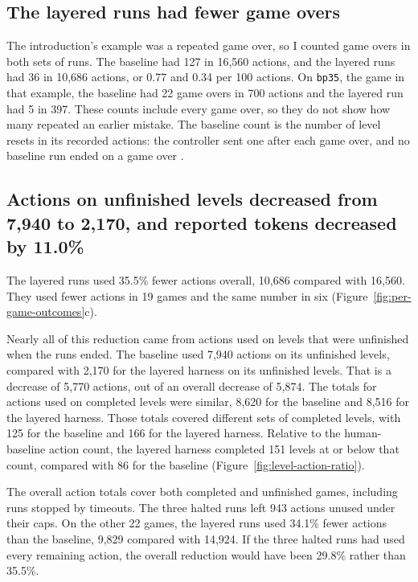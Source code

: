 \subsection{The layered runs had fewer game overs}\label{sec:result-game-overs}
The introduction's example was a repeated game over, so I counted game overs in both sets of runs. The baseline had 127 in 16,560 actions, and the layered runs had 36 in 10,686 actions, or 0.77 and 0.34 per 100 actions. On \texttt{bp35}, the game in that example, the baseline had 22 game overs in 700 actions and the layered run had 5 in 397. These counts include every game over, so they do not show how many repeated an earlier mistake. The baseline count is the number of level resets in its recorded actions: the controller sent one after each game over, and no baseline run ended on a game over \citep{dai2026baselineactions,dai2026layered}.

\subsection{Actions on unfinished levels decreased from 7,940 to 2,170, and reported tokens decreased by 11.0\%}\label{sec:result-resources}
The layered runs used 35.5\% fewer actions overall, 10,686 compared with 16,560. They used fewer actions in 19 games and the same number in six (Figure~\ref{fig:per-game-outcomes}c).

Nearly all of this reduction came from actions used on levels that were unfinished when the runs ended. The baseline used 7,940 actions on its unfinished levels, compared with 2,170 for the layered harness on its unfinished levels. That is a decrease of 5,770 actions, out of an overall decrease of 5,874. The totals for actions used on completed levels were similar, 8,620 for the baseline and 8,516 for the layered harness. Those totals covered different sets of completed levels, with 125 for the baseline and 166 for the layered harness. Relative to the human-baseline action count, the layered harness completed 151 levels at or below that count, compared with 86 for the baseline (Figure~\ref{fig:level-action-ratio}).



The overall action totals cover both completed and unfinished games, including runs stopped by timeouts. The three halted runs left 943 actions unused under their caps. On the other 22 games, the layered runs used 34.1\% fewer actions than the baseline, 9,829 compared with 14,924. If the three halted runs had used every remaining action, the overall reduction would have been 29.8\% rather than 35.5\%.

